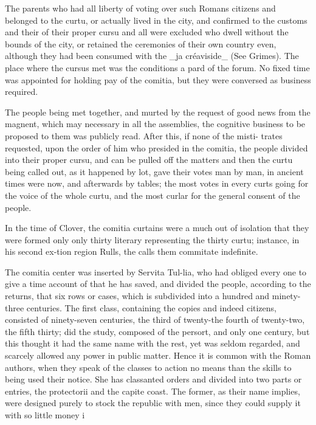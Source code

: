 The parents who had all liberty of voting over such Romans citizens and belonged to the curtu, or actually lived in the city, and confirmed to the customs and their of their proper cursu and all were excluded who dwell without the bounds of the city, or retained the ceremonies of their own country even, although they had been consumed with the \_ja créaviside\_ (See Grimes). The place where the cursus met was the conditions a pard of the forum. No fixed time was appointed for holding pay of the comitia, but they were conversed as business required.\par\medskip
The people being met together, and murted by the request of good news from the magnent, which may necessary in all the assemblies, the cognitive business to be proposed to them was publicly read. After this, if none of the misti- trates requested, upon the order of him who presided in the comitia, the people divided into their proper cursu, and can be pulled off the matters and then the curtu being called out, as it happened by lot, gave their votes man by man, in ancient times were now, and afterwards by tables; the most votes in every curts going for the voice of the whole curtu, and the most curlar for the general consent of the people.\par\medskip
In the time of Clover, the comitia curtains were a much out of isolation that they were formed only only thirty literary representing the thirty curtu; instance, in his second ex-tion region Rulls, the calls them commitate indefinite.\par\medskip
The comitia center was inserted by Servita Tul-lia, who had obliged every one to give a time account of that he has saved, and divided the people, according to the returns, that six rows or cases, which is subdivided into a hundred and minety-three centuries. The first class, containing the copies and indeed citizens, consisted of ninety-seven centuries, the third of twenty-the fourth of twenty-two, the fifth thirty; did the study, composed of the persort, and only one century, but this thought it had the same name with the rest, yet was seldom regarded, and scarcely allowed any power in public matter. Hence it is common with the Roman authors, when they speak of the classes to action no means than the skills to being used their notice. She has classanted orders and divided into two parts or entries, the protectorii and the capite coast. The former, as their name implies, were designed purely to stock the republic with men, since they could supply it with so little money i\par\medskip
